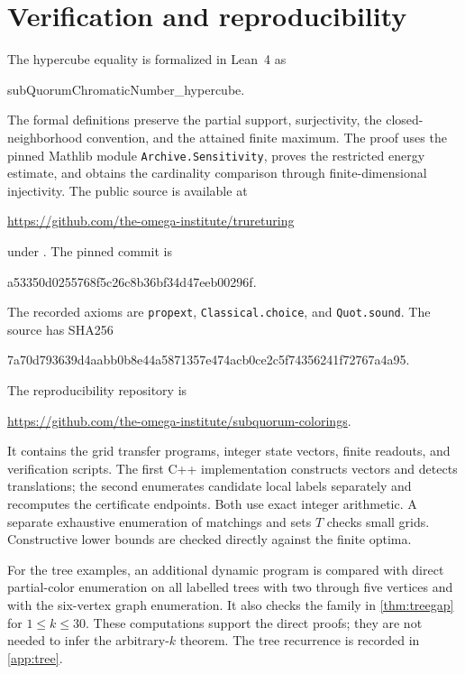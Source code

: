 \documentclass[11pt]{article}
\theoremstyle{definition}
\theoremstyle{remark}
\begin{document}
\section{Verification and reproducibility}\label{sec:verification}

The hypercube equality is formalized in Lean~4 as
\begin{center}
\small\ttfamily
subQuorumChromaticNumber\_hypercube.
\end{center}
The formal definitions preserve the partial support, surjectivity, the
closed-neighborhood convention, and the attained finite maximum. The
proof uses the pinned Mathlib module \texttt{Archive.Sensitivity}, proves
the restricted energy estimate, and obtains the cardinality comparison
through finite-dimensional injectivity. The public source is available at
\begin{center}\small
\url{https://github.com/the-omega-institute/trureturing}
\end{center}
under .
The pinned commit is
\begin{center}\small\ttfamily
a53350d0255768f5c26c8b36bf34d47eeb00296f.
\end{center}
The recorded axioms are \texttt{propext}, \texttt{Classical.choice}, and
\texttt{Quot.sound}. The source has SHA256
\begin{center}\scriptsize\ttfamily
7a70d793639d4aabb0b8e44a5871357e474acb0ce2c5f74356241f72767a4a95.
\end{center}

The reproducibility repository is
\begin{center}\small
\url{https://github.com/the-omega-institute/subquorum-colorings}.
\end{center}
It contains the grid transfer programs,
integer state vectors, finite readouts, and verification scripts.
The first C++ implementation constructs vectors and detects translations;
the second enumerates candidate local labels separately and recomputes the
certificate endpoints. Both use exact integer arithmetic. A separate
exhaustive enumeration of matchings and sets $T$ checks small grids.
Constructive lower bounds are checked directly against the finite optima.

For the tree examples, an additional dynamic program is compared with
direct partial-color enumeration on all labelled trees with two through five
vertices and with the six-vertex graph enumeration. It also checks the
family in \cref{thm:treegap} for $1\le k\le30$. These computations support
the direct proofs; they are not needed to infer the arbitrary-$k$ theorem.
The tree recurrence is recorded in \cref{app:tree}.
\end{document}
